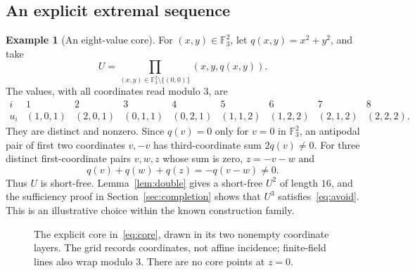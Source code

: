 \documentclass[11pt]{article}
\theoremstyle{definition}
\newtheorem{example}[theorem]{Example}
\theoremstyle{remark}
\newcommand{\F}{\mathbb F}
\begin{document}
\subsection{An explicit extremal sequence}
\begin{example}[An eight-value core]\label{ex:core}
For $(x,y)\in\F_3^2$, let $q(x,y)=x^2+y^2$, and take
\begin{equation}\label{eq:core}
 U=\prod_{(x,y)\in\F_3^2\setminus\{(0,0)\}}(x,y,q(x,y)).
\end{equation}
The values, with all coordinates read modulo $3$, are
\[
\begin{array}{c|cccccccc}
i&1&2&3&4&5&6&7&8\\\hline
u_i&(1,0,1)&(2,0,1)&(0,1,1)&(0,2,1)&
(1,1,2)&(1,2,2)&(2,1,2)&(2,2,2).
\end{array}
\]
They are distinct and nonzero. Since $q(v)=0$ only for $v=0$ in $\F_3^2$,
an antipodal pair of first two coordinates $v,-v$ has third-coordinate
sum $2q(v)\neq0$. For three distinct first-coordinate pairs $v,w,z$
whose sum is zero, $z=-v-w$ and
\[
                  q(v)+q(w)+q(z)=-q(v-w)\neq0.
\]
Thus $U$ is short-free. Lemma~\ref{lem:double} gives a short-free
$U^2$ of length $16$, and the sufficiency proof in
Section~\ref{sec:completion} shows that $U^3$ satisfies~\eqref{eq:avoid}.
This is an illustrative choice within the known construction family.
\end{example}

\begin{figure}[htbp]
\centering
{}
\caption{The explicit core in~\eqref{eq:core}, drawn in its two nonempty
coordinate layers. The grid records coordinates, not affine incidence;
finite-field lines also wrap modulo $3$. There are no core points at $z=0$.}
\label{fig:core}
\end{figure}
\end{document}
